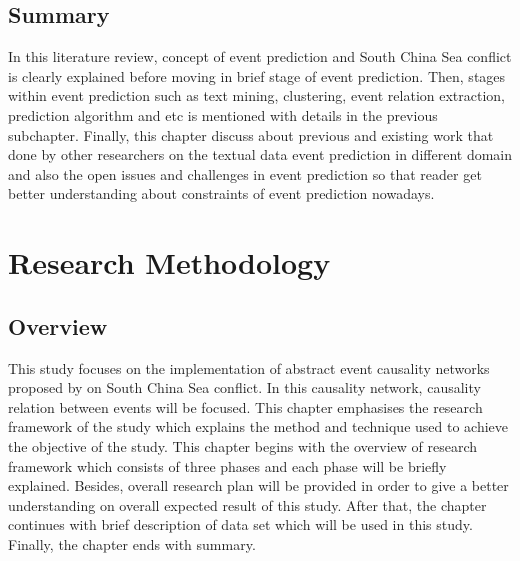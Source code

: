 \documentclass[twoside]{utmthesis}
\begin{document}
\section{Summary}
In this literature review, concept of event prediction and South China Sea conflict is clearly explained before moving in brief stage of event prediction. Then, stages within event prediction such as text mining, clustering, event relation extraction, prediction algorithm and etc is mentioned with details in the previous subchapter. Finally, this chapter discuss about previous and existing work that done by other researchers on the textual data event prediction in different domain and also the open issues and challenges in event prediction so that reader get better understanding about constraints of event prediction nowadays. 



\chapter{Research Methodology}

\section{Overview}
This study focuses on the implementation of abstract event causality networks proposed by \cite{zhao2017constructing} on South China Sea conflict. In this causality network, causality relation between events will be focused. This chapter emphasises the research framework of the study which explains the method and technique used to achieve the objective of the study. This chapter begins with the overview of research framework which consists of three phases and each phase will be briefly explained. Besides, overall research plan will be provided in order to give a better understanding on overall expected result of this study. After that, the chapter continues with brief description of data set which will be used in this study. Finally, the chapter ends with summary. 
\end{document}
